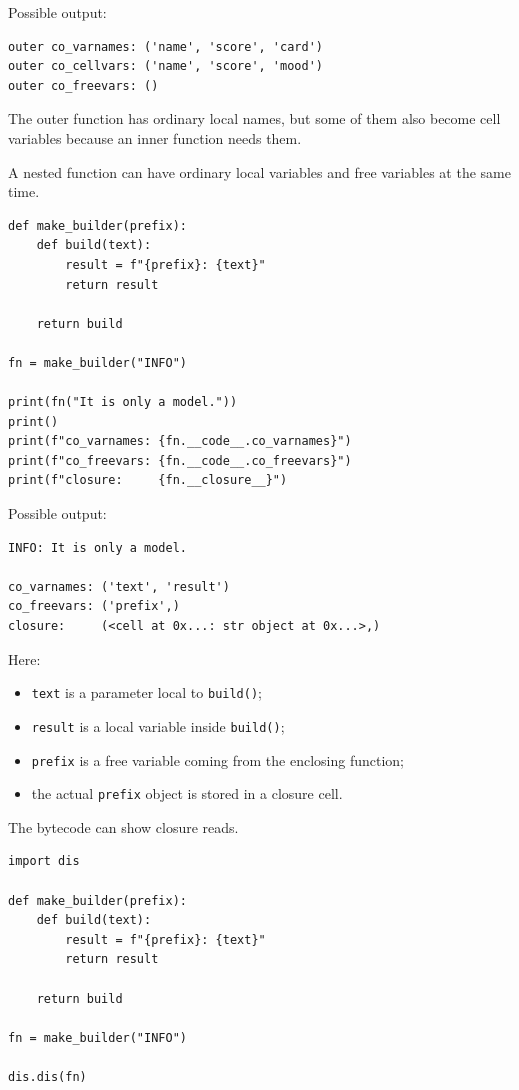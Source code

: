 Possible output:

\begin{verbatim}
outer co_varnames: ('name', 'score', 'card')
outer co_cellvars: ('name', 'score', 'mood')
outer co_freevars: ()
\end{verbatim}

The outer function has ordinary local names, but some of them also become cell variables because an inner function needs them.

A nested function can have ordinary local variables and free variables at the same time.

\begin{verbatim}
def make_builder(prefix):
    def build(text):
        result = f"{prefix}: {text}"
        return result

    return build

fn = make_builder("INFO")

print(fn("It is only a model."))
print()
print(f"co_varnames: {fn.__code__.co_varnames}")
print(f"co_freevars: {fn.__code__.co_freevars}")
print(f"closure:     {fn.__closure__}")
\end{verbatim}

Possible output:

\begin{verbatim}
INFO: It is only a model.

co_varnames: ('text', 'result')
co_freevars: ('prefix',)
closure:     (<cell at 0x...: str object at 0x...>,)
\end{verbatim}

Here:

\begin{itemize}
    \item \texttt{text} is a parameter local to \texttt{build()};
    \item \texttt{result} is a local variable inside \texttt{build()};
    \item \texttt{prefix} is a free variable coming from the enclosing function;
    \item the actual \texttt{prefix} object is stored in a closure cell.
\end{itemize}

The bytecode can show closure reads.

\begin{verbatim}
import dis

def make_builder(prefix):
    def build(text):
        result = f"{prefix}: {text}"
        return result

    return build

fn = make_builder("INFO")

dis.dis(fn)
\end{verbatim}

